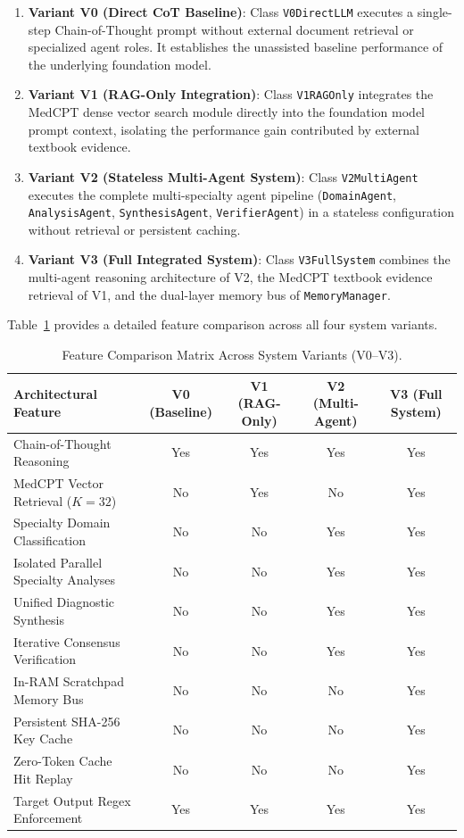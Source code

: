 \begin{enumerate}
    \item \textbf{Variant V0 (Direct CoT Baseline)}: Class \texttt{V0DirectLLM} executes a single-step Chain-of-Thought prompt without external document retrieval or specialized agent roles. It establishes the unassisted baseline performance of the underlying foundation model.
    \item \textbf{Variant V1 (RAG-Only Integration)}: Class \texttt{V1RAGOnly} integrates the MedCPT dense vector search module directly into the foundation model prompt context, isolating the performance gain contributed by external textbook evidence.
    \item \textbf{Variant V2 (Stateless Multi-Agent System)}: Class \texttt{V2MultiAgent} executes the complete multi-specialty agent pipeline (\texttt{DomainAgent}, \texttt{AnalysisAgent}, \texttt{SynthesisAgent}, \texttt{VerifierAgent}) in a stateless configuration without retrieval or persistent caching.
    \item \textbf{Variant V3 (Full Integrated System)}: Class \texttt{V3FullSystem} combines the multi-agent reasoning architecture of V2, the MedCPT textbook evidence retrieval of V1, and the dual-layer memory bus of \texttt{MemoryManager}.
\end{enumerate}

Table~\ref{tab:variant_matrix} provides a detailed feature comparison across all four system variants.

\begin{table}[htbp]
\centering
\caption{Feature Comparison Matrix Across System Variants (V0--V3).}
\label{tab:variant_matrix}
\small
\begin{tabularx}{\textwidth}{l c c c c}
\toprule
\textbf{Architectural Feature} & \textbf{V0 (Baseline)} & \textbf{V1 (RAG-Only)} & \textbf{V2 (Multi-Agent)} & \textbf{V3 (Full System)} \\
\midrule
Chain-of-Thought Reasoning & Yes & Yes & Yes & Yes \\
MedCPT Vector Retrieval ($K=32$) & No & Yes & No & Yes \\
Specialty Domain Classification & No & No & Yes & Yes \\
Isolated Parallel Specialty Analyses & No & No & Yes & Yes \\
Unified Diagnostic Synthesis & No & No & Yes & Yes \\
Iterative Consensus Verification & No & No & Yes & Yes \\
In-RAM Scratchpad Memory Bus & No & No & No & Yes \\
Persistent SHA-256 Key Cache & No & No & No & Yes \\
Zero-Token Cache Hit Replay & No & No & No & Yes \\
Target Output Regex Enforcement & Yes & Yes & Yes & Yes \\
\bottomrule
\end{tabularx}
\end{table}
